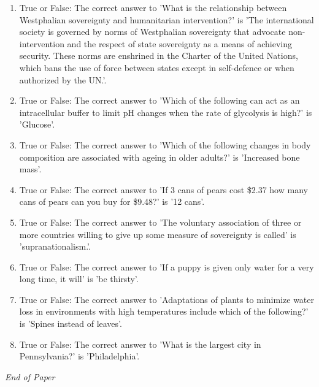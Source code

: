 \documentclass[12pt]{article}
\begin{document}
\begin{enumerate}[label=\arabic*.]
\item True or False: The correct answer to 'What is the relationship between Westphalian sovereignty and humanitarian intervention?' is 'The international society is governed by norms of Westphalian sovereignty that advocate non-intervention and the respect of state sovereignty as a means of achieving security. These norms are enshrined in the Charter of the United Nations, which bans the use of force between states except in self-defence or when authorized by the UN.'.
\item True or False: The correct answer to 'Which of the following can act as an intracellular buffer to limit pH changes when the rate of glycolysis is high?' is 'Glucose'.
\item True or False: The correct answer to 'Which of the following changes in body composition are associated with ageing in older adults?' is 'Increased bone mass'.
\item True or False: The correct answer to 'If 3 cans of pears cost \$2.37 how many cans of pears can you buy for \$9.48?' is '12 cans'.
\item True or False: The correct answer to 'The voluntary association of three or more countries willing to give up some measure of sovereignty is called' is 'supranationalism.'.
\item True or False: The correct answer to 'If a puppy is given only water for a very long time, it will' is 'be thirsty'.
\item True or False: The correct answer to 'Adaptations of plants to minimize water loss in environments with high temperatures include which of the following?' is 'Spines instead of leaves'.
\item True or False: The correct answer to 'What is the largest city in Pennsylvania?' is 'Philadelphia'.
\end{enumerate}

\vfill
\noindent\textit{End of Paper}
\end{document}
